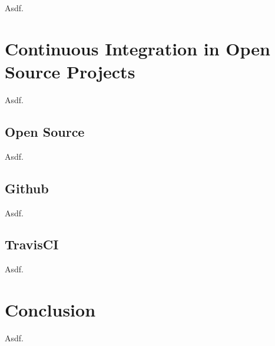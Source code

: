 Asdf.

\chapter{Continuous Integration in Open Source Projects}

Asdf.

\section{Open Source}

Asdf.

\section{Github}

Asdf.

\section{TravisCI}

Asdf.

\chapter{Conclusion}

Asdf.
